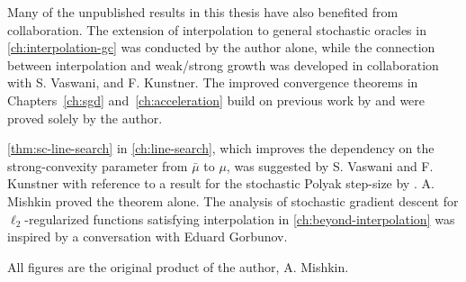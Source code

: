 Many of the unpublished results in this thesis have also benefited from collaboration. 
The extension of interpolation to general stochastic oracles in \autoref{ch:interpolation-gc} was conducted by the author alone, while the connection between interpolation and weak/strong growth was developed in collaboration with S. Vaswani, and F. Kunstner. 
The improved convergence theorems in Chapters~\ref{ch:sgd} and~\ref{ch:acceleration} build on previous work by \citet{vaswani2019fast} and were proved solely by the author.  

\autoref{thm:sc-line-search} in \autoref{ch:line-search}, which improves the dependency on the strong-convexity parameter from \( \bar \mu \) to \( \mu \), was suggested by S. Vaswani and F. Kunstner with reference to a result for the stochastic Polyak step-size by \citet{loizou2020sps}. 
A. Mishkin proved the theorem alone. 
The analysis of stochastic gradient descent for \( \ell_2 \)-regularized functions satisfying interpolation in \autoref{ch:beyond-interpolation} was inspired by a conversation with Eduard Gorbunov.

All figures are the original product of the author, A. Mishkin.
